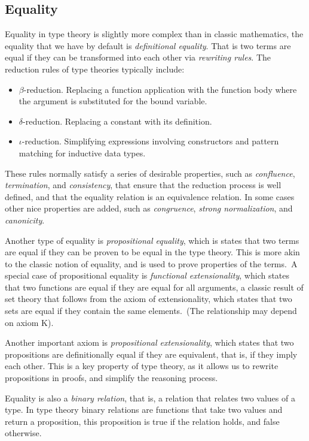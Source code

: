 \documentclass[
  a4paper, 
  10pt, 
  parskip=half, 
  DIV=20,
  toc=bibliography,
  usegeometry,
]{scrartcl}
\begin{document}
\subsection{Equality}

Equality in type theory is slightly more complex than in classic mathematics,
the equality that we have by default is \emph{definitional equality}. That is two
terms are equal if they can be transformed into each other via \emph{rewriting
rules}. The reduction rules of type theories typically include:

\begin{itemize}
\item \(\beta\)-reduction. Replacing a function application with the function 
  body where the argument is substituted for the bound variable.
\item \(\delta\)-reduction. Replacing a constant with its definition.
\item \(\iota\)-reduction. Simplifying expressions involving constructors and 
  pattern matching for inductive data types.
\end{itemize}

These rules normally satisfy a series of desirable properties, such as
\emph{confluence}, \emph{termination}, and \emph{consistency}, that ensure that 
the reduction process is well defined, and that the equality relation is an 
equivalence relation. In some cases other nice properties are added, such as 
\emph{congruence}, \emph{strong normalization}, and \emph{canonicity}.

Another type of equality is \emph{propositional equality}, which is states that two
terms are equal if they can be proven to be equal in the type theory. This is
more akin to the classic notion of equality, and is used to prove properties of
the terms.\ A special case of propositional equality is \emph{functional
extensionality}, 
which states that two functions are equal if they are
equal for all arguments, a classic result of set theory that follows from the
axiom of extensionality, which states that two sets are equal if they contain
the same elements.\ (The relationship may depend on axiom K).

Another important axiom is \emph{propositional extensionality}, which
states that two propositions are definitionally equal if they are equivalent,
that is, if they imply each other. This is a key property of type theory, as it
allows us to rewrite propositions in proofs, and simplify the reasoning process.

Equality is also a \emph{binary relation}, that is, a relation that relates two
values of a type. In type theory binary relations are functions that take two
values and return a proposition, this proposition is true if the relation holds,
and false otherwise.
\end{document}
